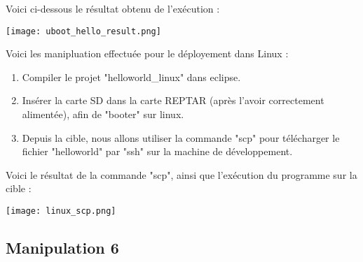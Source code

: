 Voici ci-dessous le résultat obtenu de l'exécution : 

\begin{center} 
\hspace{12.45cm}
\texttt{[image: uboot\_hello\_result.png]}
\end{center}
\vspace{1cm} 

\pagebreak

Voici les manipluation effectuée pour le déployement dans Linux :
\begin{enumerate}
\item Compiler le projet "helloworld\_linux" dans eclipse.
\item Insérer la carte SD dans la carte REPTAR (après l'avoir correctement alimentée), afin de "booter" sur linux.
\item Depuis la cible, nous allons utiliser la commande "scp" pour télécharger le fichier "helloworld" par "ssh" sur la machine de développement.
\end{enumerate}

Voici le résultat de la commande "scp", ainsi que l'exécution du programme sur la cible : 

\begin{center} 
\hspace{12.45cm}
\texttt{[image: linux\_scp.png]}
\end{center}
\vspace{1cm} 

\pagebreak
\subsection{Manipulation 6}

